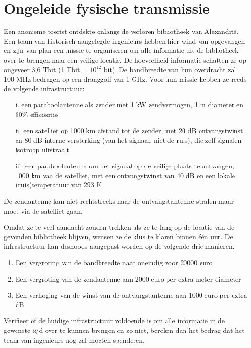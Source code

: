 \documentclass[kulak]{kulakarticle}
\begin{document}
\newpage
	\section{Ongeleide fysische transmissie}

	Een anonieme toerist ontdekte onlangs de verloren bibliotheek van Alexandrië.
	Een team van historisch aangelegde ingenieurs hebben hier wind van opgevangen en zijn van plan een missie te organiseren om alle informatie uit de bibliotheek over te brengen naar een veilige locatie. De hoeveelheid informatie schatten ze op ongeveer 3,6 Tbit (1 Tbit = \(10^{12}\) bit). De bandbreedte van hun overdracht
	zal 100 MHz bedragen op een draaggolf van 1 GHz. Voor hun missie hebben ze reeds de volgende infrastructuur:\begin{enumerate}
		\item[i. ] een paraboolantenne als zender met 1 kW zendvermogen, 1 m diameter en 80\% efficiëntie
		\item[ii. ] een satelliet op 1000 km afstand tot de zender, met 20 dB ontvangstwinst en 80 dB interne versterking (van het signaal, niet de ruis), die zelf signalen isotroop uitstraalt
		\item[iii. ] een paraboolantenne om het signaal op de veilige plaats te ontvangen, 1000 km van de satelliet, met een ontvangstwinst van 40 dB en een lokale (ruis)temperatuur van 293 K	\end{enumerate}

	De zendantenne kan niet rechtstreeks naar de ontvangstantenne stralen maar moet via de satelliet gaan.

	Omdat ze te veel aandacht zouden trekken als ze te lang op de locatie van de gevonden bibliotheek blijven, wensen ze de klus te klaren binnen één uur. De infrastructuur kan desnoods aangepast worden op de volgende drie manieren. \begin{enumerate}
		\item Een vergroting van de bandbreedte naar oneindig voor 20000 euro
		\item Een vergroting van de zendantenne aan 2000 euro per extra meter diameter
		\item Een verhoging van de winst van de ontvangstantenne aan 1000 euro per extra dB
	\end{enumerate}

	Verifieer of de huidige infrastructuur voldoende is om alle informatie in de gewenste tijd over te kunnen brengen en zo niet, bereken dan het bedrag dat het team van ingenieurs nog zal moeten spenderen.
\end{document}
